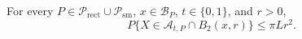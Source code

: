 For every \(P\in\mathcal{P}_{\mathrm{rect}}\cup\mathcal{P}_{\mathrm{sm}}\), \(x\in\mathcal{B}_P\), \(t\in\{0,1\}\), and \(r>0\), \[P\{X\in\mathcal{A}_{t,P}\cap B_2(x,r)\}\leq\pi Lr^2.\]